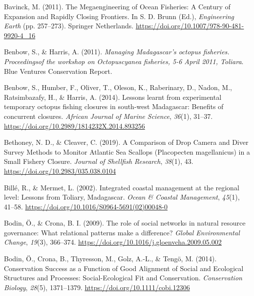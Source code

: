 \documentclass[
]{article}
\newlength{\cslhangindent}
\newlength{\cslentryspacingunit} %
\newenvironment{CSLReferences}[2] %
 {%
  \setlength{\parindent}{0pt}
  \ifodd #1
  \let\oldpar\par
  \def\par{\hangindent=\cslhangindent\oldpar}
  \fi
  \setlength{\parskip}{#2\cslentryspacingunit}
 }%
 {}
\begin{document}
\begin{CSLReferences}{1}{0}
\leavevmode{}%
Bavinck, M. (2011). The {Megaengineering} of {Ocean} {Fisheries}: {A} {Century} of {Expansion} and {Rapidly} {Closing} {Frontiers}. In S. D. Brunn (Ed.), \emph{Engineering {Earth}} (pp. 257--273). Springer Netherlands. \url{https://doi.org/10.1007/978-90-481-9920-4_16}

\leavevmode{}%
Benbow, S., \& Harris, A. (2011). \emph{Managing {Madagascar}'s octopus fisheries. {Proceedingsof} the workshop on {Octopuscyanea} fisheries, 5-6 {April} 2011, {Toliara}}. Blue Ventures Conservation Report.

\leavevmode{}%
Benbow, S., Humber, F., Oliver, T., Oleson, K., Raberinary, D., Nadon, M., Ratsimbazafy, H., \& Harris, A. (2014). Lessons learnt from experimental temporary octopus fishing closures in south-west {Madagascar}: Benefits of concurrent closures. \emph{African Journal of Marine Science}, \emph{36}(1), 31--37. \url{https://doi.org/10.2989/1814232X.2014.893256}

\leavevmode{}%
Bethoney, N. D., \& Cleaver, C. (2019). A {Comparison} of {Drop} {Camera} and {Diver} {Survey} {Methods} to {Monitor} {Atlantic} {Sea} {Scallops} ({Placopecten} magellanicus) in a {Small} {Fishery} {Closure}. \emph{Journal of Shellfish Research}, \emph{38}(1), 43. \url{https://doi.org/10.2983/035.038.0104}

\leavevmode{}%
Billé, R., \& Mermet, L. (2002). Integrated coastal management at the regional level: Lessons from {Toliary}, {Madagascar}. \emph{Ocean \& Coastal Management}, \emph{45}(1), 41--58. \url{https://doi.org/10.1016/S0964-5691(02)00048-0}

\leavevmode{}%
Bodin, Ö., \& Crona, B. I. (2009). The role of social networks in natural resource governance: {What} relational patterns make a difference? \emph{Global Environmental Change}, \emph{19}(3), 366--374. \url{https://doi.org/10.1016/j.gloenvcha.2009.05.002}

\leavevmode{}%
Bodin, Ö., Crona, B., Thyresson, M., Golz, A.-L., \& Tengö, M. (2014). Conservation {Success} as a {Function} of {Good} {Alignment} of {Social} and {Ecological} {Structures} and {Processes}: {Social}-{Ecological} {Fit} and {Conservation}. \emph{Conservation Biology}, \emph{28}(5), 1371--1379. \url{https://doi.org/10.1111/cobi.12306}


\end{CSLReferences}
\end{document}
